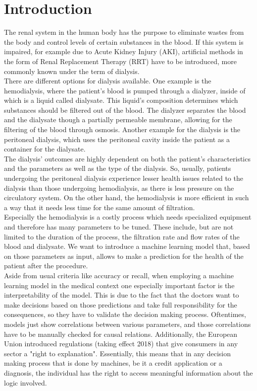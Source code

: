 \documentclass[conference,compsoc]{IEEEtran}
\begin{document}
\section{Introduction}
The renal system in the human body has the purpose to eliminate wastes from the body and control levels of certain substances in the blood. 
If this system is impaired, for example due to Acute Kidney Injury (AKI), artificial methods in the form of Renal Replacement Therapy (RRT) have to be introduced, more commonly known under the term of dialysis. \\
There are different options for dialysis available.
One example is the hemodialysis, where the patient's blood is pumped through a dialyzer, inside of which is a liquid called dialysate.
This liquid's composition determines which substances should be filtered out of the blood.
The dialyzer separates the blood and the dialysate though a partially permeable membrane, allowing for the filtering of the blood through osmosis.
Another example for the dialysis is the peritoneal dialysis, which uses the peritoneal cavity inside the patient as a container for the dialysate. \\

The dialysis’ outcomes are highly dependent on both the patient’s characteristics and the parameters as well as the type of the dialysis. 
So, usually, patients undergoing the peritoneal dialysis experience lesser health issues related to the dialysis than those undergoing hemodialysis, as there is less pressure on the circulatory system.
On the other hand, the hemodialysis is more efficient in such a way that it needs less time for the same amount of filtration. \\
Especially the hemodialysis is a costly process which needs specialized equipment and therefore has many parameters to be tuned. 
These include, but are not limited to the duration of the process, the filtration rate and flow rates of the blood and dialysate.
We want to introduce a machine learning model that, based on those parameters as input, allows to make a prediction for the health of the patient after the procedure. \\

Aside from usual criteria like accuracy or recall, when employing a machine learning model in the medical context one especially important factor is the interpretability of the model.
This is due to the fact that the doctors want to make decisions based on those predictions and take full responsibility for the consequences, so they have to validate the decision making process.
Oftentimes, models just show correlations between various parameters, and those correlations have to be manually checked for causal relations.
Additionally, the European Union introduced regulations (taking effect 2018) that give consumers in any sector a "right to explanation".
Essentially, this means that in any decision making process that is done by machines, be it a credit application or a diagnosis, the individual has the right to access meaningful information about the logic involved. \\
\end{document}
